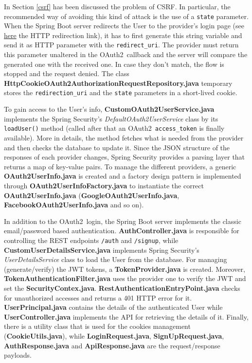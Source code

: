 \documentclass[a4paper,12pt]{article}
\def\oauth{OAuth2\xspace}
\begin{document}
In Section \ref{csrf} has been discussed the problem of CSRF. In particular, the recommended way of avoiding this kind of attack is the use of a \texttt{state} parameter. When the Spring Boot server redirects the User to the provider's login page (see \hyperlink{foo}{here} the HTTP redirection link), it has to first generate this string variable and send it as HTTP parameter with the \texttt{redirect\_uri}. The provider must return this parameter unaltered in the \oauth\ callback and the server will compare the generated one with the received one. In case they don't match, the flow is stopped and the request denied.
The class \textbf{HttpCookieOAuth2AuthorizationRequestRepository.java} temporary stores the \texttt{redirection\_uri} and the \texttt{state} parameters in a short-lived cookie.

To gain access to the User's info, \textbf{CustomOAuth2UserService.java} implements the Spring Security's \textit{DefaultOAuth2UserService} class by its \texttt{loadUser()} method (called after that an \oauth\ \texttt{access\_token} is finally available). More in details, the method fetches what is needed from the provider and then checks the database to update it. Since the JSON structure of the responses of each provider changes, Spring Security provides a parsing layer that returns a map of key-value pairs. To manage the different providers, a generic \textbf{OAuth2UserInfo.java} is created and a factory design pattern is implemented through \textbf{OAuth2UserInfoFactory.java} to instantiate the correct \textbf{OAuth2UserInfo.java} (\textbf{GoogleOAuth2UserInfo.java}, \textbf{FacebookOAuth2UserInfo.java} and so on).

In addition to the \oauth\ login, the Spring Boot server implements the classic email/password based authentication. \textbf{AuthController.java} is responsible for controlling the REST endpoints \texttt{/auth} and \texttt{/signup}, while \textbf{CustomUserDetailsService.java} implements Spring Security's \textit{UserDetailsService} class to load the User from the database. For managing (generate/verify) the JWT tokens, a \textbf{TokenProvider.java} is created. Moreover, \textbf{TokenAuthenticationFilter.java} uses the provider one to verify the JWT and set the \textbf{SecurityContex.java}. \textbf{RestAuthenticationEntryPoint.java} checks for unauthorized accesses and returns a 401 HTTP error for it. \textbf{UserPrincipal.java} contains the details of the authenticated User while \textbf{UserController.java} implements the API for retrieving the details of it. Finally, there is a utility class that is used for the cookies management (\textbf{CookieUtils.java}), while \textbf{LoginRequest.java}, \textbf{SignUpRequest.java}, \textbf{AuthResponse.java} and \textbf{ApiResponse.java} are the request/response payloads.
\end{document}
